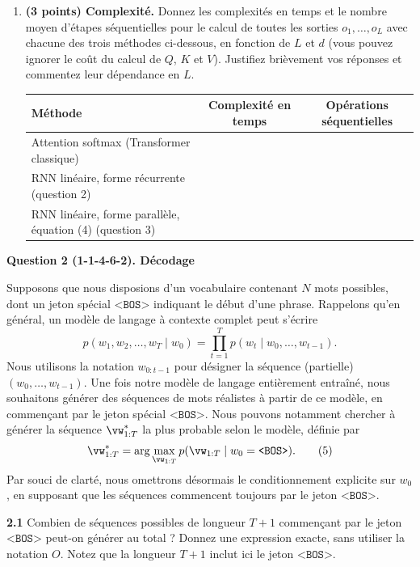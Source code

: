 \documentclass[12pt]{article}
\newif\ifsolution
\theoremstyle{definition}
\newcommand{\Answer}[1]{%
  \ifsolution
    {\color{answer}#1}%
  \fi
}
\newcommand{\question}[2]{\par\medskip\noindent\textbf{Question #1. #2}\par\medskip}
\newcommand{\bos}{\texttt{<BOS>}}
\begin{document}
\begin{enumerate}[start=2]
\item \textbf{(3 points) Complexité.} Donnez les complexités en temps et le nombre moyen d'étapes séquentielles pour le calcul de toutes les sorties $o_1,\ldots,o_L$ avec chacune des trois méthodes ci-dessous, en fonction de $L$ et $d$ (vous pouvez ignorer le coût du calcul de $Q$, $K$ et $V$). Justifiez brièvement vos réponses et commentez leur dépendance en $L$.
{\small
\begin{center}
\begin{tabularx}{\linewidth}{@{}Xcc@{}}\toprule
\textbf{Méthode} & \textbf{Complexité en temps} & \textbf{Opérations séquentielles}\\\midrule
Attention softmax (Transformer classique) & & \\
RNN linéaire, forme récurrente (question 2) & & \\
RNN linéaire, forme parallèle, équation (4) (question 3) & & \\\bottomrule
\end{tabularx}
\end{center}
}
\end{enumerate}

\Answer{

}


\question{2 (1-1-4-6-2)}{Décodage}
Supposons que nous disposions d'un vocabulaire contenant $N$ mots possibles, dont un jeton spécial $\bos$ indiquant le début d'une phrase. Rappelons qu'en général, un modèle de langage à contexte complet peut s'écrire
\[
p(w_1,w_2,\ldots,w_T\mid w_0)=\prod_{t=1}^T p(w_t\mid w_0,\ldots,w_{t-1}).
\]
Nous utilisons la notation $w_{0:t-1}$ pour désigner la séquence (partielle) $(w_0,\ldots,w_{t-1})$. Une fois notre modèle de langage entièrement entraîné, nous souhaitons générer des séquences de mots réalistes à partir de ce modèle, en commençant par le jeton spécial $\bos$. Nous pouvons notamment chercher à générer la séquence $\vw_{1:T}^*$ la plus probable selon le modèle, définie par
\begin{equation}\vw_{1:T}^*=\arg\max_{\vw_{1:T}}p(\vw_{1:T}\mid w_0=\bos).\tag{5}\end{equation}
Par souci de clarté, nous omettrons désormais le conditionnement explicite sur $w_0$, en supposant que les séquences commencent toujours par le jeton $\bos$.

\textbf{2.1} Combien de séquences possibles de longueur $T+1$ commençant par le jeton $\bos$ peut-on générer au total ? Donnez une expression exacte, sans utiliser la notation $O$. Notez que la longueur $T+1$ inclut ici le jeton $\bos$.
\end{document}
